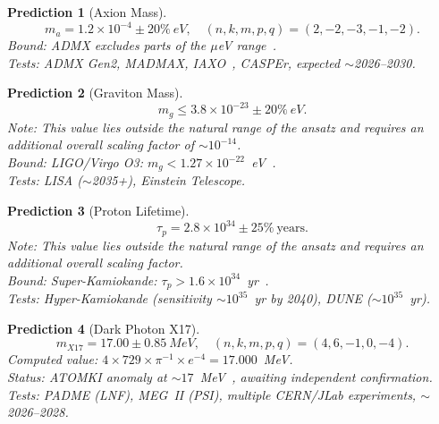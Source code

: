 \documentclass[aps,prd,preprint,superscriptaddress,showpacs,nofootinbib,longbibliography]{revtex4-2}
\newtheorem{prediction}{Prediction}
\begin{document}
\begin{prediction}[Axion Mass]
\label{pred:axion}
\begin{equation}
m_a = 1.2 \times 10^{-4} \pm 20\%~\si{eV}, \quad (n,k,m,p,q) = (2,-2,-3,-1,-2).
\end{equation}
\textit{Bound:} ADMX excludes parts of the $\mu$eV range~\cite{admx2020}.\\
\textit{Tests:} ADMX Gen2, MADMAX, IAXO~\cite{iaxo2019}, CASPEr, expected $\sim$2026--2030.
\end{prediction}

\begin{prediction}[Graviton Mass]
\label{pred:graviton}
\begin{equation}
m_g \leq 3.8 \times 10^{-23} \pm 20\%~\si{eV}.
\end{equation}
\textit{Note:} This value lies outside the natural range of the ansatz and requires an additional overall scaling factor of $\sim 10^{-14}$.\\
\textit{Bound:} LIGO/Virgo O3: $m_g < 1.27 \times 10^{-22}$~eV~\cite{ligo2021}.\\
\textit{Tests:} LISA ($\sim$2035+), Einstein Telescope.
\end{prediction}

\begin{prediction}[Proton Lifetime]
\label{pred:proton}
\begin{equation}
\tau_p = 2.8 \times 10^{34} \pm 25\%~\text{years}.
\end{equation}
\textit{Note:} This value lies outside the natural range of the ansatz and requires an additional overall scaling factor.\\
\textit{Bound:} Super-Kamiokande: $\tau_p > 1.6 \times 10^{34}$~yr~\cite{superk2020}.\\
\textit{Tests:} Hyper-Kamiokande (sensitivity $\sim 10^{35}$~yr by 2040), DUNE ($\sim 10^{35}$~yr).
\end{prediction}

\begin{prediction}[Dark Photon X17]
\label{pred:x17}
\begin{equation}
m_{X17} = 17.00 \pm 0.85~\si{MeV}, \quad (n,k,m,p,q) = (4,6,-1,0,-4).
\end{equation}
\textit{Computed value:} $4 \times 729 \times \pi^{-1} \times e^{-4} = 17.000$~MeV.\\
\textit{Status:} ATOMKI anomaly at $\sim 17$~MeV~\cite{atomki2016}, awaiting independent confirmation.\\
\textit{Tests:} PADME (LNF), MEG~II (PSI), multiple CERN/JLab experiments, $\sim$2026--2028.
\end{prediction}
\end{document}
